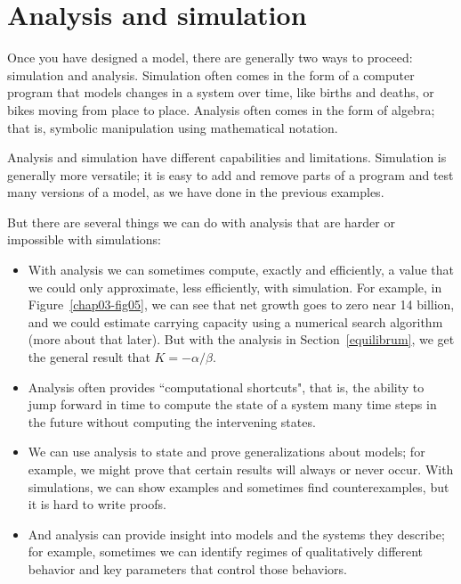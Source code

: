 \documentclass[12pt]{book}
\theoremstyle{exercise}
\begin{document}
\section{Analysis and simulation}

Once you have designed a model, there are generally two ways to proceed: simulation and analysis.  Simulation often comes in the form of a computer program that models changes in a system over time, like births and deaths, or bikes moving from place to place.  Analysis often comes in the form of algebra; that is, symbolic manipulation using mathematical notation.

Analysis and simulation have different capabilities and limitations.  Simulation is generally more versatile; it is easy to add and remove parts of a program and test many versions of a model, as we have done in the previous examples.

But there are several things we can do with analysis that are harder or impossible with simulations:

\begin{itemize}

\item With analysis we can sometimes compute, exactly and efficiently, a value that we could only approximate, less efficiently, with simulation.  For example, in Figure~\ref{chap03-fig05}, we can see that net growth goes to zero near 14 billion, and we could estimate carrying capacity using a numerical search algorithm (more about that later).  But with the analysis in Section~\ref{equilibrum}, we get the general result that $K=-\alpha/\beta$.

\item Analysis often provides ``computational shortcuts", that is, the ability to jump forward in time to compute the state of a system many time steps in the future without computing the intervening states.

\item We can use analysis to state and prove generalizations about models; for example, we might prove that certain results will always or never occur.  With simulations, we can show examples and sometimes find counterexamples, but it is hard to write proofs.

\item And analysis can provide insight into models and the systems they describe; for example, sometimes we can identify regimes of qualitatively different behavior and key parameters that control those behaviors.

\end{itemize}
\end{document}

